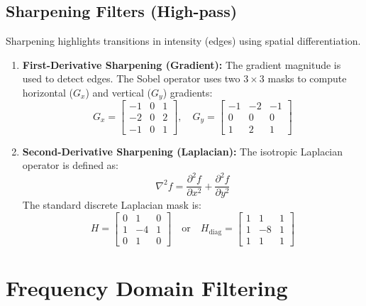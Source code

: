 \documentclass[12pt,a4paper]{article}
\begin{document}
\subsection{Sharpening Filters (High-pass)}
Sharpening highlights transitions in intensity (edges) using spatial differentiation.
\begin{enumerate}[leftmargin=*, itemsep=3.5pt]
  \item \textbf{First-Derivative Sharpening (Gradient):}
    The gradient magnitude is used to detect edges. The Sobel operator uses two $3 \times 3$ masks to compute horizontal ($G_x$) and vertical ($G_y$) gradients:
    \begin{equation}
      G_x = \begin{bmatrix} -1 & 0 & 1 \\ -2 & 0 & 2 \\ -1 & 0 & 1 \end{bmatrix}, \quad
      G_y = \begin{bmatrix} -1 & -2 & -1 \\ 0 & 0 & 0 \\ 1 & 2 & 1 \end{bmatrix}
    \end{equation}
  \item \textbf{Second-Derivative Sharpening (Laplacian):}
    The isotropic Laplacian operator is defined as:
    \begin{equation}
      \nabla^2 f = \frac{\partial^2 f}{\partial x^2} + \frac{\partial^2 f}{\partial y^2}
    \end{equation}
    The standard discrete Laplacian mask is:
    \begin{equation}
      H = \begin{bmatrix} 0 & 1 & 0 \\ 1 & -4 & 1 \\ 0 & 1 & 0 \end{bmatrix} \quad \text{or} \quad
      H_{\text{diag}} = \begin{bmatrix} 1 & 1 & 1 \\ 1 & -8 & 1 \\ 1 & 1 & 1 \end{bmatrix}
    \end{equation}
\end{enumerate}

\section{Frequency Domain Filtering}
\end{document}
